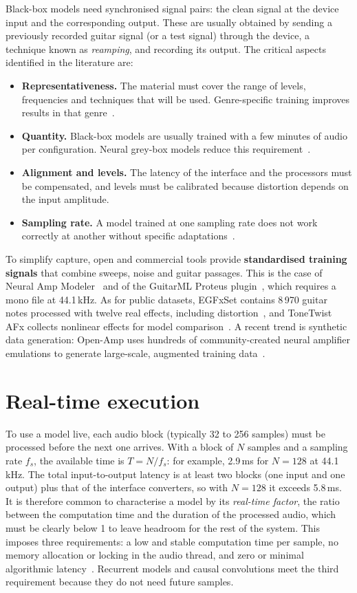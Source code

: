 \documentclass[ENG]{TFUOC}%
\begin{document}
Black-box models need synchronised signal pairs: the clean signal at the device input and the corresponding output. These are usually obtained by sending a previously recorded guitar signal (or a test signal) through the device, a technique known as \emph{reamping}, and recording its output. The critical aspects identified in the literature are:
\begin{itemize}[nosep]
    \item \textbf{Representativeness.} The material must cover the range of levels, frequencies and techniques that will be used. Genre-specific training improves results in that genre~\cite{cassidy2023}.
    \item \textbf{Quantity.} Black-box models are usually trained with a few minutes of audio per configuration. Neural grey-box models reduce this requirement~\cite{miklanek2023}.
    \item \textbf{Alignment and levels.} The latency of the interface and the processors must be compensated, and levels must be calibrated because distortion depends on the input amplitude.
    \item \textbf{Sampling rate.} A model trained at one sampling rate does not work correctly at another without specific adaptations~\cite{carson2024}.
\end{itemize}

To simplify capture, open and commercial tools provide \textbf{standardised training signals} that combine sweeps, noise and guitar passages. This is the case of Neural Amp Modeler~\cite{nam} and of the GuitarML Proteus plugin~\cite{proteus}, which requires a mono file at 44.1\,kHz. As for public datasets, EGFxSet contains 8\,970 guitar notes processed with twelve real effects, including distortion~\cite{pedroza2022}, and ToneTwist AFx collects nonlinear effects for model comparison~\cite{comunita2025}. A recent trend is synthetic data generation: Open-Amp uses hundreds of community-created neural amplifier emulations to generate large-scale, augmented training data~\cite{wright2025openamp}.

\section{Real-time execution}
\label{s:tempsreal}

To use a model live, each audio block (typically 32 to 256 samples) must be processed before the next one arrives. With a block of $N$ samples and a sampling rate $f_s$, the available time is $T=N/f_s$: for example, 2.9\,ms for $N=128$ at 44.1\,kHz. The total input-to-output latency is at least two blocks (one input and one output) plus that of the interface converters, so with $N=128$ it exceeds 5.8\,ms. It is therefore common to characterise a model by its \emph{real-time factor}, the ratio between the computation time and the duration of the processed audio, which must be clearly below 1 to leave headroom for the rest of the system. This imposes three requirements: a low and stable computation time per sample, no memory allocation or locking in the audio thread, and zero or minimal algorithmic latency~\cite{chowdhury2021}. Recurrent models and causal convolutions meet the third requirement because they do not need future samples.
\end{document}
